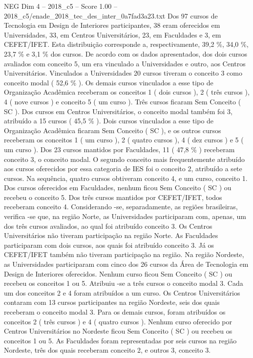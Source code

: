 \begin{textsample}{NEG Dim 4 – 2018\_c5 – Score 1.00 – 2018\_c5/enade\_2018\_tec\_des\_inter\_0a7fad3a23.txt}
Dos 97 cursos de Tecnologia em Design de Interiores participantes, 38 eram oferecidos em Universidades, 33, em Centros Universitários, 23, em Faculdades e 3, em CEFET/IFET.
Esta distribuição corresponde a, respectivamente, 39,2 \%, 34,0 \%, 23,7 \% e 3,1 \% dos cursos.
De acordo com os dados apresentados, dos dois cursos avaliados com conceito 5, um era vinculado a Universidades e outro, aos Centros Universitários.
Vinculados a Universidades 20 cursos tiveram o conceito 3 como conceito modal ( 52,6 \% ).
Os demais cursos vinculados a esse tipo de Organização Acadêmica receberam os conceitos 1 ( dois cursos ), 2 ( três cursos ), 4 ( nove cursos ) e conceito 5 ( um curso ).
Três cursos ficaram Sem Conceito ( SC ).
Dos cursos em Centros Universitários, o conceito modal também foi 3, atribuído a 15 cursos ( 45,5 \% ).
Dois cursos vinculados a esse tipo de Organização Acadêmica ficaram Sem Conceito ( SC ), e os outros cursos receberam os conceitos 1 ( um curso ), 2 ( quatro cursos ), 4 ( dez cursos ) e 5 ( um curso ).
Dos 23 cursos mantidos por Faculdades, 11 ( 47,8 \% ) receberam conceito 3, o conceito modal.
O segundo conceito mais frequentemente atribuído aos cursos oferecidos por essa categoria de IES foi o conceito 2, atribuído a sete cursos.
Na sequência, quatro cursos obtiveram conceito 4, e um curso, conceito 1.
Dos cursos oferecidos em Faculdades, nenhum ficou Sem Conceito ( SC ) ou recebeu o conceito 5.
Dos três cursos mantidos por CEFET/IFET, todos receberam conceito 4.
Considerando -se, separadamente, as regiões brasileiras, verifica -se que, na região Norte, as Universidades participaram com, apenas, um dos três cursos avaliados, ao qual foi atribuído conceito 3.
Os Centros Universitários não tiveram participação na região Norte.
As Faculdades participaram com dois cursos, aos quais foi atribuído conceito 3.
Já os CEFET/IFET também não tiveram participação na região.
Na região Nordeste, as Universidades participaram com cinco dos 26 cursos da Área de Tecnologia em Design de Interiores oferecidos.
Nenhum curso ficou Sem Conceito ( SC ) ou recebeu os conceitos 1 ou 5.
Atribuiu -se a três cursos o conceito modal 3.
Cada um dos conceitos 2 e 4 foram atribuídos a um curso.
Os Centros Universitários contaram com 13 cursos participantes na região Nordeste, seis dos quais receberam o conceito modal 3.
Para os demais cursos, foram atribuídos os conceitos 2 ( três cursos ) e 4 ( quatro cursos ).
Nenhum curso oferecido por Centros Universitários no Nordeste ficou Sem Conceito ( SC ) ou recebeu os conceitos 1 ou 5.
As Faculdades foram representadas por seis cursos na região Nordeste, três dos quais receberam conceito 2, e outros 3, conceito 3.

\end{textsample}
